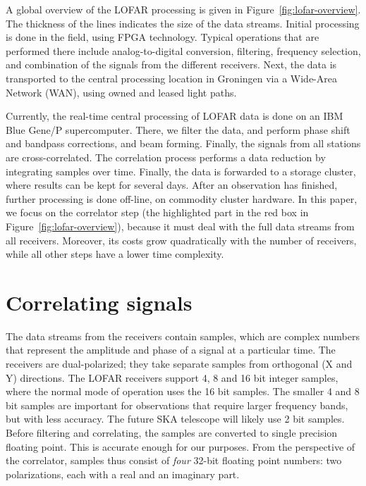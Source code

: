 \documentclass{article}
\begin{document}
A global overview of the LOFAR processing is given in
Figure~\ref{fig:lofar-overview}. The thickness of the lines indicates
the size of the data streams.  Initial processing is done in the
field, using FPGA technology.  Typical operations that are performed
there include analog-to-digital conversion, filtering, frequency
selection, and combination of the signals from the different
receivers.  Next, the data is transported to the central processing
location in Groningen via a Wide-Area Network (WAN), using owned and
leased light paths.

Currently, the real-time central processing of LOFAR data is done on
an IBM Blue Gene/P supercomputer.  There, we filter the data, and
perform phase shift and bandpass corrections, and beam forming.
Finally, the signals from all stations are cross-correlated.  The
correlation process performs a data reduction by integrating samples
over time.  Finally, the data is forwarded to a storage cluster, where
results can be kept for several days.  After an observation has
finished, further processing is done off-line, on commodity cluster
hardware.  In this paper, we focus on the correlator step (the
highlighted part in the red box in
Figure~\ref{fig:lofar-overview}), because it must deal with the
full data streams from all receivers. Moreover, its costs grow
quadratically with the number of receivers, while all other steps have
a lower time complexity.


\section{Correlating signals}
\label{sec:correlating}






The data streams from the receivers contain samples, which are complex
numbers that represent the amplitude and phase of a signal at a
particular time.  The receivers are dual-polarized; they take separate
samples from orthogonal (X and Y) directions.  The LOFAR receivers
support 4, 8 and 16 bit integer samples, where the normal mode of
operation uses the 16 bit samples. The smaller 4 and 8 bit samples are important
for observations that require larger frequency bands, but with less accuracy.
The future SKA telescope will
likely use 2 bit samples.  Before filtering and correlating, the
samples are converted to single precision floating point.  This is
accurate enough for our purposes. From the perspective of the
correlator, samples thus consist of \emph{four} 32-bit floating point
numbers: two polarizations, each with a real and an imaginary part.
\end{document}
